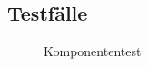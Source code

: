 \subsection{Testfälle}
\label{app:Test}

\begin{figure}[htb]
	\centering
	\caption{Komponententest}
\end{figure}

%
